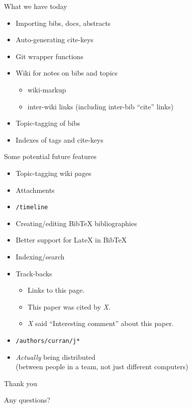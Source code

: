 \documentclass[sansserif]{beamer}
\begin{document}
\begin{frame}{What we have today}
	\begin{itemize}
		\item Importing bibs, docs, abstracts
		\item Auto-generating cite-keys
		\item Git wrapper functions
		\item Wiki for notes on bibs and topics
		\begin{itemize}
			\item wiki-markup
			\item inter-wiki links (including inter-bib ``cite'' links)
		\end{itemize}
		\item Topic-tagging of bibs
		\item Indexes of tags and cite-keys
	\end{itemize}
\end{frame}

\begin{frame}{Some potential future features}
	\begin{itemize}
		\item Topic-tagging wiki pages
		\item Attachments
		\item {\tt /timeline}
		\item Creating/editing BibTeX bibliographies
		\item Better support for LateX in BibTeX
		\item Indexing/search
		\item Track-backs
		\begin{itemize}
			\item Links to this page.
			\item This paper was cited by \textit{X}.
			\item \textit{X} said ``Interesting comment'' about this paper.
		\end{itemize}
		\item {\tt /authors/curran/j*}
		\item \textit{Actually} being distributed
		\\ {\small (between people in a team, not just different computers)}
	\end{itemize}
\end{frame}

\begin{frame}{Thank you}
	\begin{center}
		{\Huge Any questions?}
	\end{center}
\end{frame}
\end{document}

